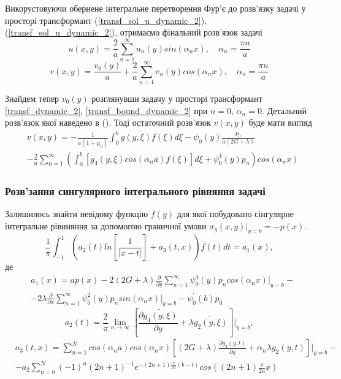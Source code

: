 Викорустовуючи обернене інтегральне перетворення Фур'є до розв'язку задачі у просторі трансформант
(\ref{transf_sol_u_dynamic_2}), (\ref{transf_sol_u_dynamic_2}), отримаємо фінальний розв'язок задачі
\begin{equation}
    u(x,y) = \frac{2}{a} \sum_{n=1}^{\infty} u_n(y) sin(\alpha_n x), \quad \alpha_n = \frac{\pi n}{a}
\end{equation}
\begin{equation}
    v(x,y) = \frac{v_0(y)}{a} + \frac{2}{a} \sum_{n=1}^{\infty} v_n(y) cos(\alpha_n x), \quad \alpha_n = \frac{\pi n}{a}
\end{equation}

Знайдем тепер $v_0(y)$ розглянувши задачу у просторі трансформант \eqref{transf_dynamic_2}, \eqref{transf_bound_dynamic_2} при $n=0$, $\alpha_n = 0$.
Детальний розв'язок якої наведено в (). Тоді остаточний розв'язок $v(x,y)$ буде мати вигляд
\begin{align}
    &v(x,y) = -\frac{1}{a(1+\mu_0)} \int_{0}^{b}g(y,\xi) f(\xi) d\xi - \psi_0(y) \frac{p_0}{a(2G + \lambda)} \nonumber \\
    &- \frac{2}{a} \sum_{n=1}^{\infty} \left( \int_0^b \left[g_4(y, \xi) cos(\alpha_n a) f(\xi) \right]d\xi + \psi_0^4(y) p_n  \right) cos(\alpha_n x)
\end{align}

\subsubsection{Розв'зання сингулярного інтегрального рівняння задачі}
Залишилось знайти невідому функцію $f(y)$ для якої побудовано сінгулярне інтегральне рівнняння за допомогою граничної умови $\sigma_y(x, y) |_{y=b} = -p(x)$.
\begin{equation}\label{int_eq_dynamic_2}
    \frac{1}{\pi} \int_{-1}^{1} \left( a_2(t) ln\left[ \frac{1}{\lvert x - t \rvert} \right] + a_3(t, x) \right) f(t) dt = a_1(x),
\end{equation}
де
\begin{align*}
    &a_1(x) = a p(x) - 2(2G + \lambda) \frac{\partial}{\partial y} \sum_{n=1}^{\infty} \psi_0^{4}(y) p_n cos(\alpha_n x)|_{y=b} - \nonumber \\
    &- 2\lambda \frac{\partial}{\partial x} \sum_{n=1}^{\infty}\psi_0^2(y) p_n sin(\alpha_n x)|_{y=b} - \psi_0^{'}(b) p_0
\end{align*}
\begin{equation*}
    a_2(t) = \frac{2}{\pi} \lim_{n \rightarrow \infty}\left[ \frac{\partial \widetilde{g_4(y, \xi)}}{\partial y} + \lambda \widetilde{g_2(y, \xi)} \right]|_{y=b}, 
\end{equation*}
\begin{align*}
    &a_3(t, x) = \sum_{n=1}^{N} cos(\alpha_n a) cos(\alpha_n x) \left[(2G + \lambda) \frac{\partial g_4(y, t)}{\partial y} + \alpha_n \lambda g_2(y, t) \right]|_{y=b} - \\
    & - a_2 \sum_{n=0}^{N} (-1)^n (2n + 1)^{-1} e^{-(2n + 1) \frac{\pi}{2a} (b - t)} cos((2n + 1) \frac{\pi}{2a} x)
\end{align*}

